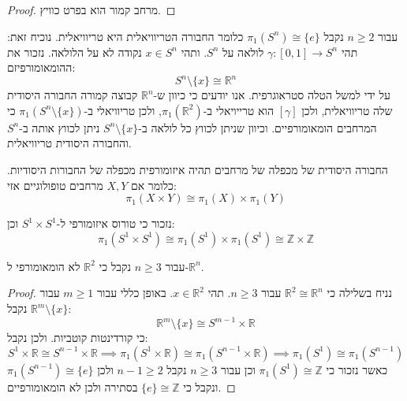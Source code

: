 \documentclass{tstextbook}
\begin{document}
\begin{proof}
מרחב קמור הוא בפרט כוויץ.

\end{proof}
\begin{example}
עבור \(n\geq 2\) נקבל \(\pi_{1}(S^{n})\cong \{ e \}\) כלומר החבורה הטריוויאלית היא טריוויאלית. נוכיח זאת:
תהי \(\gamma:[0,1]\to S^{n}\) לולאה על \(S^{n}\). ותהי \(x \in S^{n}\) נקודה לא על הלולאה. נזכור את ההומאומורפיזם:
$$S^{n}\setminus \{ x \}\cong \mathbb{R}^{n}$$
על ידי למשל הטלה סטראוגרפית. אנו יודעים כי כיוון ש-\(\mathbb{R}^{n}\) קבוצה קמורה החבורה היסודית שלה טריוויאלית, ולכן \(\left[ \gamma \right]\) הוא טרייויאלי ב-\(\pi_{1}\left( \mathbb{R}^{2} \right)\), ולכן טריוויאלי ב-\(\pi_{1}\left( S^{n}\setminus \{ x \} \right)\) כי המרחבים הומאומורפיים. וכיוון שניתן לכווץ כל לולאה ב-\(S^{n}\setminus \{ x \}\) ניתן לכווץ אותה ב-\(S^{n}\) והחבורה היסודית טריוויאלית.

\end{example}
\begin{proposition}
החבורה היסודית של מכפלה של מרחבים תהיה איזומורפית מכפלה של החבורות היסודיות. כלומר אם \(X,Y\) מרחבים טופולוגיים אזי:
$$\pi_{1}\left( X\times Y \right)\cong \pi_{1}(X)\times \pi_{1}(Y)$$

\end{proposition}
\begin{example}
נזכור כי טורוס איזומורפי ל-\(S^{1}\times S^{1}\) וכן:
$$\pi_{1}\left( S^{1}\times S^{1}\right)\cong \pi_{1}(S^{1})\times \pi_{1}(S^{1})\cong  \mathbb{Z}\times \mathbb{Z}$$

\end{example}
\begin{example}
עבור \(n\geq 3\) נקבל כי \(\mathbb{R}^{2}\) לא הומאומורפי ל-\(\mathbb{R}^{n}\).

\end{example}
\begin{proof}
נניח בשלילה כי \(\mathbb{R}^{2}\cong \mathbb{R}^{n}\) עבור \(n\geq 3\). תהי \(x\in \mathbb{R}^{2}\). באופן כללי עבור \(m \geq 1\) עבור \(\mathbb{R}^{m}\setminus \{x \}\) נקבל:
$$\mathbb{R}^{m}\setminus \{ x \}\cong S^{m-1}\times \mathbb{R}$$
כי קורדינטות קוטביות. ולכן נקבל:
$$S^{1}\times \mathbb{R}\cong S^{n-1}\times \mathbb{R}\implies \pi_{1}\left( S^{1}\times \mathbb{R} \right)\cong \pi_{1}\left( S^{n-1}\times \mathbb{R} \right)\implies \pi_{1}(S^{1})\cong \pi_{1}(S^{n-1})$$
כאשר נזכור כי \(\pi_{1}(S^{1})\cong\mathbb{Z}\) וכן עבור \(n\geq 3\) נקבל \(n-1\geq 2\) ולכן \(\pi_{1}(S^{n-1})\cong\{ e \}\) ונקבל כי \(\{ e \}\cong \mathbb{Z}\) בסתירה ולכן לא הומאומורפיים.

\end{proof}
\end{document}
